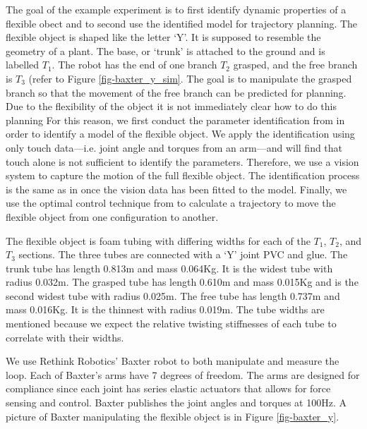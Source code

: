 \documentclass[runningheads,a4paper]{llncs}
\begin{document}
The goal of the example experiment is to first identify dynamic properties of a flexible obect and to second use the identified model for trajectory planning. The flexible object is shaped like the letter `Y'.  It is supposed to resemble the geometry of a plant. The base, or `trunk' is attached to the ground and is labelled $T_1$. The robot has the end of one branch $T_2$ grasped, and the free branch is $T_3$ (refer to Figure \ref{fig-baxter_y_sim}.  The goal is to manipulate the grasped branch so that the movement of the free branch can be predicted for planning.  
Due to the flexibility of the object it is not immediately clear how to do this planning
For this reason, we first conduct the parameter identification from \cite{caldwell_coleman_correll_iros} in order to identify a model of the flexible object. We apply the identification using only touch data---i.e. joint angle and torques from an arm---and will find that touch alone is not sufficient to identify the parameters. Therefore, we use a vision system to capture the motion of the full flexible object. The identification process is the same as in \cite{caldwell_coleman_correll_iros} once the vision data has been fitted to the model.  Finally, we use the optimal control technique from \cite{hauser} to calculate a trajectory to move the flexible object from one configuration to another.

The flexible object is foam tubing with differing widths for each of the $T_1$, $T_2$, and $T_3$ sections. The three tubes are connected with a `Y' joint PVC and glue.  The trunk tube has length 0.813m and mass 0.064Kg. It is the widest tube with radius 0.032m. The grasped tube has length 0.610m and mass 0.015Kg and is the second widest tube with radius 0.025m. The free tube has length 0.737m and mass 0.016Kg. It is the thinnest with radius 0.019m.  The tube widths are mentioned because we expect the relative twisting stiffnesses of each tube to correlate with their widths. 

We use Rethink Robotics' Baxter \cite{guizzo2011rethink} robot to both manipulate and measure the loop.  Each of Baxter's arms have 7 degrees of freedom.  The arms are designed for compliance since each joint has series elastic actuators that allows for force sensing and control.  Baxter publishes the joint angles and torques at 100Hz.  A picture of Baxter manipulating the flexible object is in Figure \ref{fig-baxter_y}. 
\end{document}

